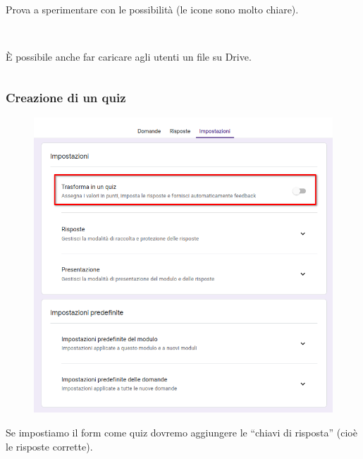 \documentclass[handout]{beamer}
\begin{document}
\begin{frame}
\begin{columns}
\begin{column}{.65\textwidth}
    ~

    Prova a sperimentare con le possibilità (le icone sono molto chiare).\pause

    ~

    È possibile anche far caricare agli utenti un file su Drive.
  \end{column}
\end{columns}
\end{frame}


\begin{frame}
\frametitle{Creazione di un quiz}
\begin{figure}
  \includegraphics[width=.5\columnwidth]{img/form7.png}
\end{figure}
Se impostiamo il form come quiz dovremo aggiungere le ``chiavi di risposta'' (cioè le risposte corrette).
\end{frame}
\end{document}
